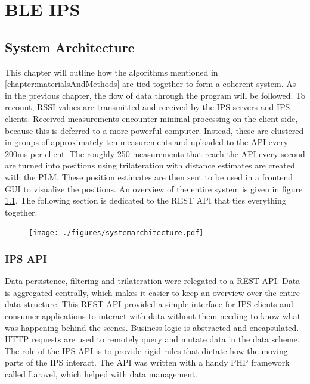 \documentclass[a4paper, oneside]{ipsreport}
\begin{document}
\chapter{BLE IPS}
\label{chapter:bleips}

\section{System Architecture}
\label{section:systemarchitecture}
This chapter will outline how the algorithms mentioned in \ref{chapter:materialsAndMethods} are tied together to form a coherent system. As in the previous chapter, the flow of data through the program will be followed. To recount, RSSI values are transmitted and received by the IPS servers and IPS clients. Received measurements encounter minimal processing on the client side, because this is deferred to a more powerful computer. Instead, these are clustered in groups of approximately ten measurements and uploaded to the API every 200ms per client. The roughly 250 measurements that reach the API every second are turned into positions using trilateration with distance estimates are created with the PLM. These position estimates are then sent to be used in a frontend GUI to visualize the positions. An overview of the entire system is given in figure \ref{fig:systemarchitecture}. The following section is dedicated to the REST API that ties everything together.

\begin{figure}[h]
	\centering
	\texttt{[image: ./figures/systemarchitecture.pdf]}
	\label{fig:systemarchitecture}
\end{figure}

\subsection{IPS API}
Data persistence, filtering and trilateration were relegated to a REST API. Data is aggregated centrally, which makes it easier to keep an overview over the entire data-structure. This REST API provided a simple interface for IPS clients and consumer applications to interact with data without them needing to know what was happening behind the scenes. Business logic is abstracted and encapsulated. HTTP requests are used to remotely query and mutate data in the data scheme. The role of the IPS API is to provide rigid rules that dictate how the moving parts of the IPS interact. The API was written with a handy PHP framework called Laravel, which helped with data management.
\end{document}
